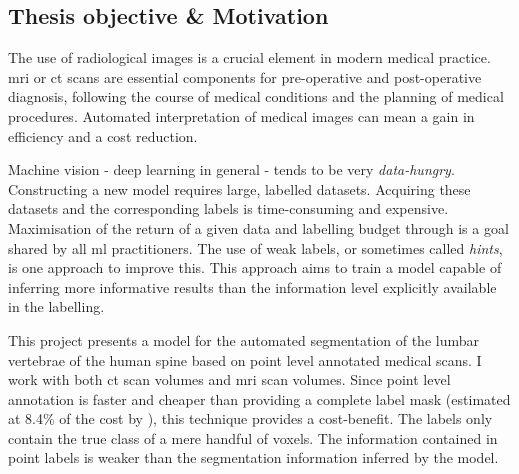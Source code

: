 \begin{multicols}{2}
\section*{Thesis objective \& Motivation}
\par{
    The use of radiological images is a crucial element in modern medical practice. 
    \acrfull{mri} or \acrfull{ct} scans are essential components for pre-operative and post-operative diagnosis, following the course of medical conditions and the planning of medical procedures.
    Automated interpretation of medical images can mean a gain in efficiency and a cost reduction.
}
\par{
    Machine vision - deep learning in general - tends to be very \textit{data-hungry}. Constructing a new model requires large, labelled datasets.
    Acquiring these datasets and the corresponding labels is time-consuming and expensive. 
    Maximisation of the return of a given data and labelling budget through is a goal shared by all \acrshort{ml} practitioners.
    The use of weak labels, or sometimes called \textit{hints}, is one approach to improve this.
    This approach aims to train a model capable of inferring more informative results than the information level explicitly available in the labelling.
}
\par{
    This project presents a model for the automated segmentation of the lumbar vertebrae of the human spine based on point level annotated medical scans.
    I work with both \acrshort{ct} scan volumes and \acrshort{mri} scan volumes.
    Since point level annotation is faster and cheaper than providing a complete label mask (estimated at 8.4\% of the cost by \cite{Bearman2015}), this technique provides a cost-benefit. 
    The labels only contain the true class of a mere handful of voxels. The information contained in point labels is weaker than the segmentation information inferred by the model.
}




\end{multicols}
